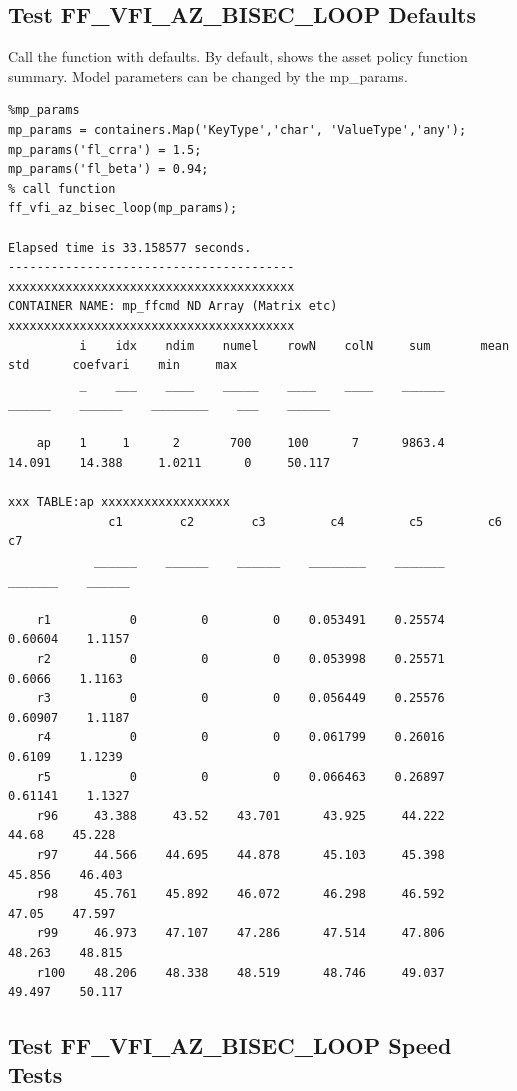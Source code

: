 \documentclass[
]{book}
\begin{document}
\hypertarget{test-ff_vfi_az_bisec_loop-defaults}{%
\subsection{Test FF\_VFI\_AZ\_BISEC\_LOOP Defaults}\label{test-ff_vfi_az_bisec_loop-defaults}}

Call the function with defaults. By default, shows the asset policy
function summary. Model parameters can be changed by the mp\_params.

\begin{verbatim}
%mp_params
mp_params = containers.Map('KeyType','char', 'ValueType','any');
mp_params('fl_crra') = 1.5;
mp_params('fl_beta') = 0.94;
% call function
ff_vfi_az_bisec_loop(mp_params);

Elapsed time is 33.158577 seconds.
----------------------------------------
xxxxxxxxxxxxxxxxxxxxxxxxxxxxxxxxxxxxxxxx
CONTAINER NAME: mp_ffcmd ND Array (Matrix etc)
xxxxxxxxxxxxxxxxxxxxxxxxxxxxxxxxxxxxxxxx
          i    idx    ndim    numel    rowN    colN     sum       mean      std      coefvari    min     max  
          _    ___    ____    _____    ____    ____    ______    ______    ______    ________    ___    ______

    ap    1     1      2       700     100      7      9863.4    14.091    14.388     1.0211      0     50.117

xxx TABLE:ap xxxxxxxxxxxxxxxxxx
              c1        c2        c3         c4         c5         c6         c7  
            ______    ______    ______    ________    _______    _______    ______

    r1           0         0         0    0.053491    0.25574    0.60604    1.1157
    r2           0         0         0    0.053998    0.25571     0.6066    1.1163
    r3           0         0         0    0.056449    0.25576    0.60907    1.1187
    r4           0         0         0    0.061799    0.26016     0.6109    1.1239
    r5           0         0         0    0.066463    0.26897    0.61141    1.1327
    r96     43.388     43.52    43.701      43.925     44.222      44.68    45.228
    r97     44.566    44.695    44.878      45.103     45.398     45.856    46.403
    r98     45.761    45.892    46.072      46.298     46.592      47.05    47.597
    r99     46.973    47.107    47.286      47.514     47.806     48.263    48.815
    r100    48.206    48.338    48.519      48.746     49.037     49.497    50.117
\end{verbatim}

\hypertarget{test-ff_vfi_az_bisec_loop-speed-tests}{%
\subsection{Test FF\_VFI\_AZ\_BISEC\_LOOP Speed Tests}\label{test-ff_vfi_az_bisec_loop-speed-tests}}
\end{document}
